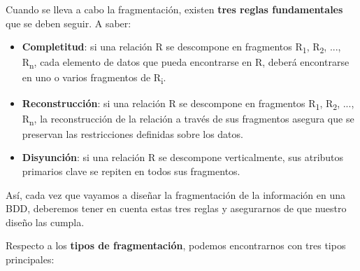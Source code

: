 Cuando se lleva a cabo la fragmentación, existen \textbf{tres reglas fundamentales} que se deben seguir. A saber:

\begin{itemize}
    \item \textbf{Completitud}: si una relación R se descompone en fragmentos R\textsubscript{1}, R\textsubscript{2}, ..., R\textsubscript{n}, cada elemento de datos que pueda encontrarse en R, deberá encontrarse en uno o varios fragmentos de R\textsubscript{i}.

    \item \textbf{Reconstrucción}: si una relación R se descompone en fragmentos R\textsubscript{1}, R\textsubscript{2}, ..., R\textsubscript{n}, la reconstrucción de la relación a través de sus fragmentos asegura que se preservan las restricciones definidas sobre los datos.

    \item \textbf{Disyunción}: si una relación R se descompone verticalmente, sus atributos primarios clave se repiten en todos sus fragmentos.
\end{itemize}

Así, cada vez que vayamos a diseñar la fragmentación de la información en una BDD, deberemos tener en cuenta estas tres reglas y asegurarnos de que nuestro diseño las cumpla.

Respecto a los \textbf{tipos de fragmentación}, podemos encontrarnos con tres tipos principales:

